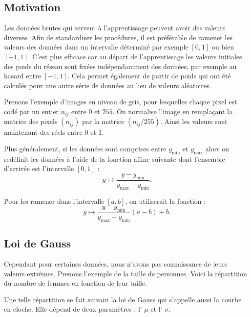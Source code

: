 \documentclass[11pt,class=report,crop=false]{standalone}
\begin{document}

\subsection{Motivation}

Les données brutes qui servent à l'apprentissage peuvent avoir des valeurs diverses.
Afin de standardiser les procédures, il est préférable de ramener les valeurs des données dans un intervalle déterminé par exemple $[0,1]$ ou bien $[-1,1]$. 
C'est plus efficace car au départ de l'apprentissage les valeurs initiales des poids du réseau sont fixées indépendamment des données, par exemple au hasard entre $[-1,1]$.
Cela permet également de partir de poids qui ont été calculés pour une autre série de données au lieu de valeurs aléatoires.

Prenons l'exemple d'images en niveau de gris, pour lesquelles chaque pixel est codé par un entier $n_{ij}$ entre $0$ et $255$. On \og{}normalise\fg{} l'image en remplaçant la matrice des pixels $(n_{ij})$ par la matrice $(n_{ij}/255)$. Ainsi les valeurs sont maintenant des réels entre $0$ et $1$.


Plus généralement, si les données sont comprises entre $y_{\min}$ et $y_{\max}$ alors on redéfinit les données à l'aide de la fonction affine suivante dont l'ensemble d'arrivée est l'intervalle $[0,1]$ : 
$$y \mapsto \frac{y - y_{\min}}{y_{\max} - y_{\min}}.$$ 

Pour les ramener dans l'intervalle $[a,b]$, on utiliserait la fonction :
$$y \mapsto \frac{y - y_{\min}}{y_{\max} - y_{\min}}(a-b) + b.$$


\subsection{Loi de Gauss}

Cependant pour certaines données, nous n'avons pas connaissance de leurs valeurs extrêmes.
Prenons l'exemple de la taille de personnes. Voici la répartition du nombre de femmes en fonction de leur taille.


Une telle répartition se fait suivant la \og{}loi de Gauss\fg{} qui s'appelle aussi la courbe en cloche. Elle dépend de deux paramètres : l' $\mu$ et l' $\sigma$.
\end{document}
